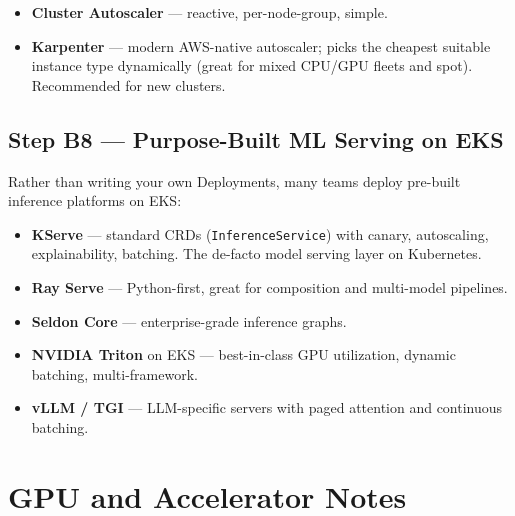 \documentclass[11pt,a4paper]{article}
\begin{document}
\begin{itemize}[leftmargin=*]
    \item \textbf{Cluster Autoscaler} --- reactive, per-node-group, simple.
    \item \textbf{Karpenter} --- modern AWS-native autoscaler; picks the
          cheapest suitable instance type dynamically (great for mixed
          CPU/GPU fleets and spot). Recommended for new clusters.
\end{itemize}

\subsection{Step B8 --- Purpose-Built ML Serving on EKS}

Rather than writing your own Deployments, many teams deploy pre-built
inference platforms on EKS:

\begin{itemize}[leftmargin=*]
    \item \textbf{KServe} --- standard CRDs (\texttt{InferenceService}) with
          canary, autoscaling, explainability, batching. The de-facto model
          serving layer on Kubernetes.
    \item \textbf{Ray Serve} --- Python-first, great for composition and
          multi-model pipelines.
    \item \textbf{Seldon Core} --- enterprise-grade inference graphs.
    \item \textbf{NVIDIA Triton} on EKS --- best-in-class GPU utilization,
          dynamic batching, multi-framework.
    \item \textbf{vLLM / TGI} --- LLM-specific servers with paged attention
          and continuous batching.
\end{itemize}

\section{GPU and Accelerator Notes}
\end{document}
